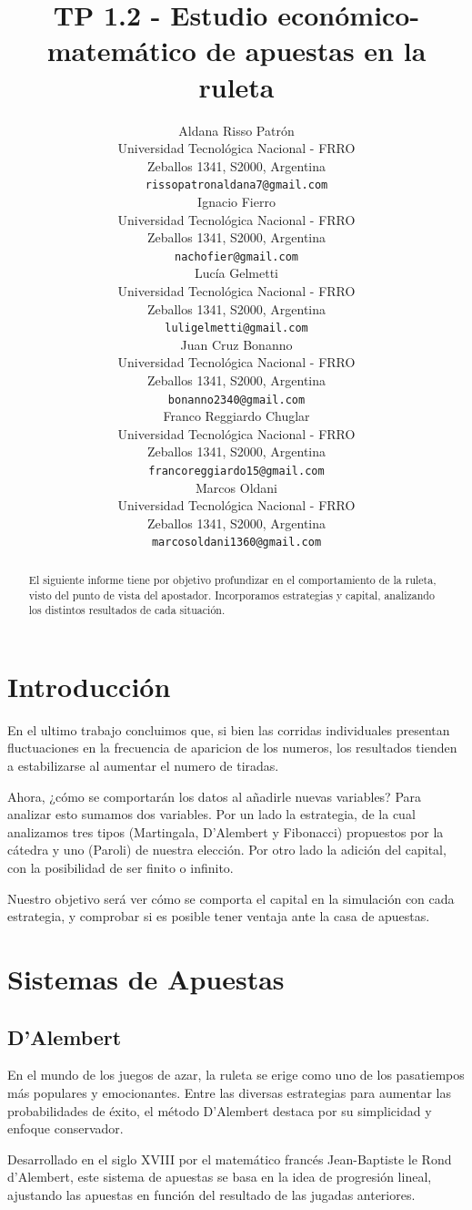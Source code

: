 \documentclass{article}
\title{TP 1.2 - Estudio económico-matemático de apuestas en la ruleta }
\author{
 Aldana Risso Patrón \\
  Universidad Tecnológica Nacional - FRRO \\
  Zeballos 1341, S2000, Argentina \\
  \texttt{rissopatronaldana7@gmail.com} \\
   \And
 Ignacio Fierro \\
  Universidad Tecnológica Nacional - FRRO \\
  Zeballos 1341, S2000, Argentina \\
  \texttt{nachofier@gmail.com} \\
  \And
 Lucía Gelmetti \\
  Universidad Tecnológica Nacional - FRRO \\
  Zeballos 1341, S2000, Argentina \\
  \texttt{luligelmetti@gmail.com} \\
  \And
 Juan Cruz Bonanno \\
  Universidad Tecnológica Nacional - FRRO \\
  Zeballos 1341, S2000, Argentina \\
  \texttt{bonanno2340@gmail.com} \\
  \And
 Franco Reggiardo Chuglar \\
  Universidad Tecnológica Nacional - FRRO\\
  Zeballos 1341, S2000, Argentina \\
  \texttt{francoreggiardo15@gmail.com} \\
  \And
 Marcos Oldani \\
  Universidad Tecnológica Nacional - FRRO \\
  Zeballos 1341, S2000, Argentina \\
  \texttt{marcosoldani1360@gmail.com} \\
}
\begin{document}
\maketitle
\begin{abstract}
El siguiente informe tiene por objetivo profundizar en el comportamiento de la ruleta, visto del punto de vista del apostador. Incorporamos estrategias y capital, analizando los distintos resultados de cada situación.
\end{abstract}


\section{Introducción}
En el ultimo trabajo concluimos que, si bien las corridas individuales presentan fluctuaciones en la frecuencia de aparicion de los numeros, los resultados tienden a estabilizarse al aumentar el numero de tiradas. 

Ahora, ¿cómo se comportarán los datos al añadirle nuevas variables? Para analizar esto sumamos dos variables. Por un lado la estrategia, de la cual analizamos tres tipos (Martingala, D'Alembert y Fibonacci) propuestos por la cátedra y uno (Paroli) de nuestra elección. Por otro lado la adición del capital, con la posibilidad de ser finito o infinito.

Nuestro objetivo será ver cómo se comporta el capital en la simulación con cada estrategia, y comprobar si es posible tener ventaja ante la casa de apuestas.


\section{Sistemas de Apuestas}
\subsection{D'Alembert}
En el mundo de los juegos de azar, la ruleta se erige como uno de los pasatiempos más populares y emocionantes. Entre las diversas estrategias para aumentar las probabilidades de éxito, el método D'Alembert destaca por su simplicidad y enfoque conservador.

Desarrollado en el siglo XVIII por el matemático francés Jean-Baptiste le Rond d'Alembert, este sistema de apuestas se basa en la idea de progresión lineal, ajustando las apuestas en función del resultado de las jugadas anteriores.
\end{document}
